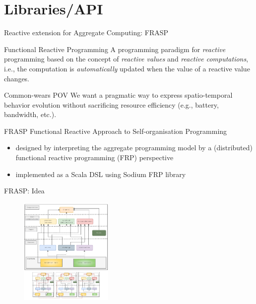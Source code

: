 \documentclass[presentation, 9pt, aspectratio=169]{beamer}\mode<presentation>{\usetheme{AMSBolognaFC}}
\begin{document}
\section{Libraries/API}
\begin{frame}{Reactive extension for Aggregate Computing: FRASP}
	\begin{alertblock}{Functional Reactive Programming}
		A programming paradigm for \emph{reactive} programming based on the concept of \emph{reactive values} and \emph{reactive computations}, i.e., the computation is \emph{automatically} updated when the value of a reactive value changes.
	\end{alertblock}
	\begin{exampleblock}{Common-wears POV}
		We want a pragmatic way to express spatio-temporal behavior evolution without sacrificing resource efficiency (e.g., battery, bandwidth, etc.).
	\end{exampleblock}
	\begin{exampleblock}{FRASP}
		Functional Reactive Approach to Self-organisation Programming
		\begin{itemize}
			\item designed by interpreting the aggregate programming model by a (distributed) functional
			reactive programming (FRP) perspective
			\item implemented as a Scala DSL using Sodium FRP library
		\end{itemize}
	\end{exampleblock}
\end{frame}
\begin{frame}{FRASP: Idea}
\begin{figure}
	\centering
	\includegraphics[width=0.4\textwidth]{img/idea}
\end{figure}
\end{frame}
\end{document}
